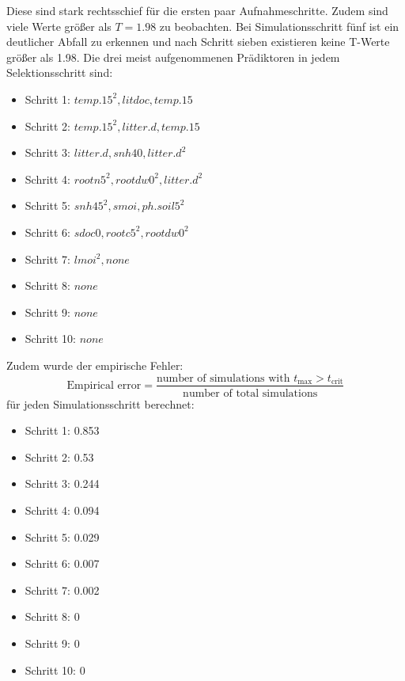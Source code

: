 Diese sind stark rechtsschief für die ersten paar Aufnahmeschritte. Zudem sind viele Werte
größer als $T=1.98$ zu beobachten. Bei Simulationsschritt fünf ist ein deutlicher Abfall zu erkennen und
nach Schritt sieben existieren keine T-Werte größer als 1.98. Die drei meist aufgenommenen
Prädiktoren in jedem Selektionsschritt sind: 
\begin{itemize}
  \item Schritt 1: $temp.15^2, litdoc, temp.15$
  \item Schritt 2: $temp.15^2, litter.d, temp.15$
  \item Schritt 3: $litter.d, snh40, litter.d^2$
  \item Schritt 4: $rootn5^2, rootdw0^2, litter.d^2$
  \item Schritt 5: $snh45^2, smoi, ph.soil5^2$
  \item Schritt 6: $sdoc0, rootc5^2, rootdw0^2$
  \item Schritt 7: $lmoi^2, none$ 
  \item Schritt 8: $none$
  \item Schritt 9: $none$
  \item Schritt 10: $none$
\end{itemize}
Zudem wurde der empirische Fehler:
\begin{equation}
  \text{Empirical error} = \frac{\text{number of simulations with } t_{\max} > t_{\text{crit}}}{\text{number of total simulations}}
\end{equation}
für jeden Simulationsschritt berechnet:
\begin{itemize}
  \item Schritt 1: 0.853
  \item Schritt 2: 0.53
  \item Schritt 3: 0.244
  \item Schritt 4: 0.094
  \item Schritt 5: 0.029
  \item Schritt 6: 0.007
  \item Schritt 7: 0.002
  \item Schritt 8: 0
  \item Schritt 9: 0
  \item Schritt 10: 0
\end{itemize}
